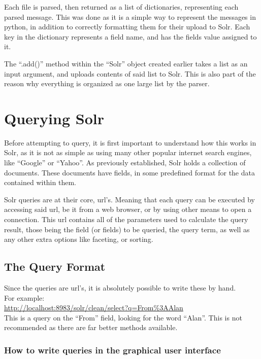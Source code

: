 \documentclass[a4paper,english]{report}
\begin{document}
Each file is parsed, then returned as a list of dictionaries, representing each parsed message. This was done as it is a simple way to represent the messages in python, in addition to correctly formatting them for their upload to Solr.
Each key in the dictionary represents a field name,  and has the fields value assigned to it.


The “.add()” method within the “Solr” object created earlier takes a list as an input argument, and uploads contents of said list to Solr. This is also part of the reason why everything is organized as one large list by the parser.

\section{Querying Solr}

Before attempting to query, it is first important to understand how this works in Solr, as it is not as simple as using many other popular internet search engines, like “Google” or “Yahoo”. 
As previously established, Solr holds a collection of documents. These documents have fields, in some predefined format for the data contained within them.

Solr queries are at their core, url's. Meaning that each query can be executed by accessing said url, be it from a web browser, or by using other means to open a connection.
This url contains all of the parameters used to calculate the query result,
those being the field (or fields) to be queried, the query term, as well as any other extra options like faceting, or sorting.


\subsection{The Query Format}

Since the queries are url's, it is absolutely possible to write these by hand.\\
For example:\\

\url{http://localhost:8983/solr/clean/select?q=From%3AAlan}\\

This is a query on the “From” field, looking for the word “Alan”.
This is not recommended as there are far better methods available.

\subsubsection{How to write queries in the graphical user interface}
\end{document}
